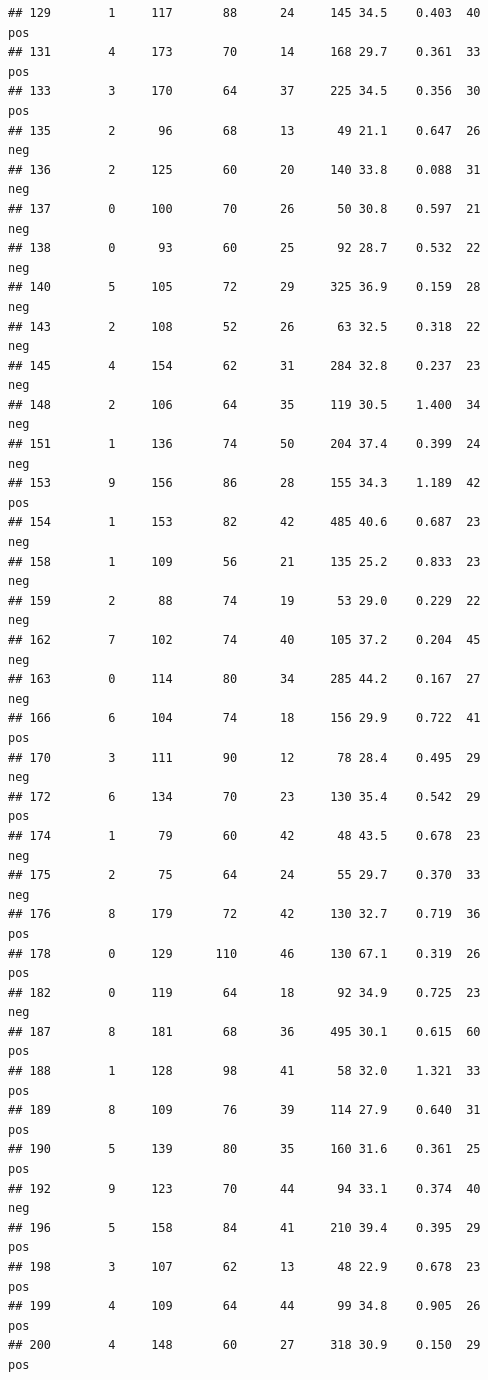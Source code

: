 \documentclass[
]{article}
\begin{document}
\begin{verbatim}
## 129        1     117       88      24     145 34.5    0.403  40      pos
## 131        4     173       70      14     168 29.7    0.361  33      pos
## 133        3     170       64      37     225 34.5    0.356  30      pos
## 135        2      96       68      13      49 21.1    0.647  26      neg
## 136        2     125       60      20     140 33.8    0.088  31      neg
## 137        0     100       70      26      50 30.8    0.597  21      neg
## 138        0      93       60      25      92 28.7    0.532  22      neg
## 140        5     105       72      29     325 36.9    0.159  28      neg
## 143        2     108       52      26      63 32.5    0.318  22      neg
## 145        4     154       62      31     284 32.8    0.237  23      neg
## 148        2     106       64      35     119 30.5    1.400  34      neg
## 151        1     136       74      50     204 37.4    0.399  24      neg
## 153        9     156       86      28     155 34.3    1.189  42      pos
## 154        1     153       82      42     485 40.6    0.687  23      neg
## 158        1     109       56      21     135 25.2    0.833  23      neg
## 159        2      88       74      19      53 29.0    0.229  22      neg
## 162        7     102       74      40     105 37.2    0.204  45      neg
## 163        0     114       80      34     285 44.2    0.167  27      neg
## 166        6     104       74      18     156 29.9    0.722  41      pos
## 170        3     111       90      12      78 28.4    0.495  29      neg
## 172        6     134       70      23     130 35.4    0.542  29      pos
## 174        1      79       60      42      48 43.5    0.678  23      neg
## 175        2      75       64      24      55 29.7    0.370  33      neg
## 176        8     179       72      42     130 32.7    0.719  36      pos
## 178        0     129      110      46     130 67.1    0.319  26      pos
## 182        0     119       64      18      92 34.9    0.725  23      neg
## 187        8     181       68      36     495 30.1    0.615  60      pos
## 188        1     128       98      41      58 32.0    1.321  33      pos
## 189        8     109       76      39     114 27.9    0.640  31      pos
## 190        5     139       80      35     160 31.6    0.361  25      pos
## 192        9     123       70      44      94 33.1    0.374  40      neg
## 196        5     158       84      41     210 39.4    0.395  29      pos
## 198        3     107       62      13      48 22.9    0.678  23      pos
## 199        4     109       64      44      99 34.8    0.905  26      pos
## 200        4     148       60      27     318 30.9    0.150  29      pos

\end{verbatim}
\end{document}
